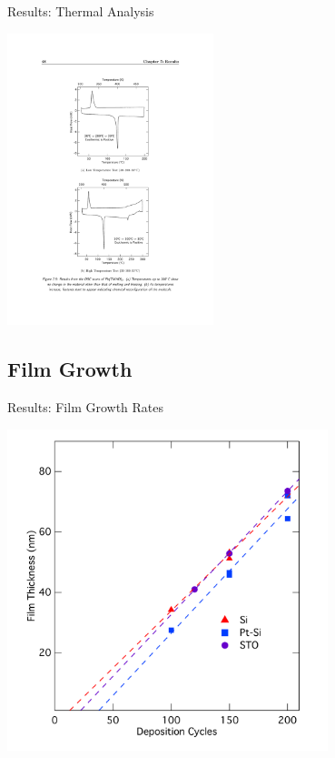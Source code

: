 \documentclass[professionalfont]{beamer}
\begin{document}
\begin{frame}{Results: Thermal Analysis}
\begin{overprint}
\begin{center}
{			\hspace{0.5cm}%
			\includegraphics[width=0.45\textwidth]{./graphics/data/dsc/tmhd}}
		\end{center}
		
\end{overprint}
\end{frame}

\subsection{Film Growth}
\begin{frame}{Results: Film Growth Rates}
\centerline{\includegraphics[width=0.7\textwidth]{./graphics/data/ellipsometry/Ellip-Rates}}
\end{frame}
\end{document}
